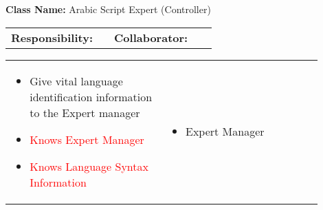 \begin{cards}[]
    \textbf{Class Name:} Arabic Script Expert (Controller)
    \tcbline
    \begin{tabular}{p{0.45\linewidth} | p{0.45\linewidth}}
        \textbf{Responsibility:}& 
        \textbf{Collaborator:}\\
    \end{tabular}
    \tcbline
    \begin{tabular}{p{0.45\linewidth} | p{0.45\linewidth}}
        \begin{itemize}
            \item Give vital language identification information to the Expert manager
            \item \textcolor{red}{Knows Expert Manager}
            \item \textcolor{red}{Knows Language Syntax Information}
        \end{itemize}
        &
        \begin{itemize}
            \item Expert Manager
        \end{itemize}
    \end{tabular}
\end{cards}